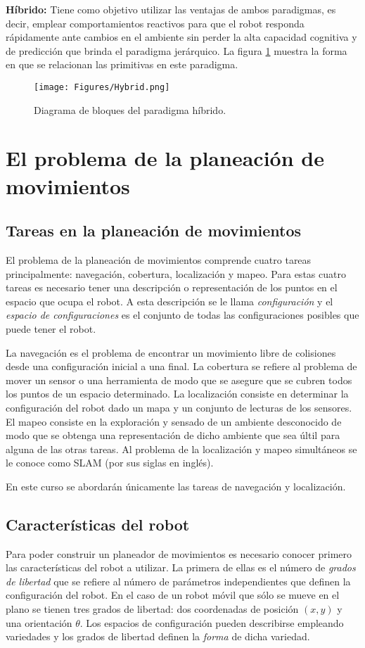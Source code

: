 \documentclass[a4paper]{article}
\begin{document}
\textbf{Híbrido:} Tiene como objetivo utilizar las ventajas de ambos paradigmas, es decir, emplear comportamientos reactivos para que el robot responda rápidamente ante cambios en el ambiente sin perder la alta capacidad cognitiva y de predicción que brinda el paradigma jerárquico. La figura \ref{fig:ParadigmHybrid} muestra la forma en que se relacionan las primitivas en este paradigma. 
\begin{figure}
  \centering
  \texttt{[image: Figures/Hybrid.png]}
  \caption{Diagrama de bloques del paradigma híbrido.}
  \label{fig:ParadigmHybrid}
\end{figure}


\section{El problema de la planeación de movimientos}
\subsection{Tareas en la planeación de movimientos}
\label{sec:Tasks}

El problema de la planeación de movimientos comprende cuatro tareas principalmente: navegación, cobertura, localización y mapeo. 
Para estas cuatro tareas es necesario tener una descripción o representación de los puntos en el espacio que ocupa el robot. A esta descripción se le llama \textit{configuración} y el \textit{espacio de configuraciones} es el conjunto de todas las configuraciones posibles que puede tener el robot.

La navegación es el problema de encontrar un movimiento libre de colisiones desde una configuración inicial a una final. La cobertura se refiere al problema de mover un sensor o una herramienta de modo que se asegure que se cubren todos los puntos de un espacio determinado. La localización consiste en determinar la configuración del robot dado un mapa y un conjunto de lecturas de los sensores. El mapeo consiste en la exploración y sensado de un ambiente desconocido de modo que se obtenga una representación de dicho ambiente que sea últil para alguna de las otras tareas. Al problema de la localización y mapeo simultáneos se le conoce como SLAM (por sus siglas en inglés). 

En este curso se abordarán únicamente las tareas de navegación y localización. 

\subsection{Características del robot}
Para poder construir un planeador de movimientos es necesario conocer primero las características del robot a utilizar. La primera de ellas es el número de \textit{grados de libertad} que se refiere al número de parámetros independientes que definen la configuración del robot. En el caso de un robot móvil que sólo se mueve en el plano se tienen tres grados de libertad: dos coordenadas de posición $(x,y)$ y una orientación $\theta$. Los espacios de configuración pueden describirse empleando variedades y los grados de libertad definen la \textit{forma} de dicha variedad.
\end{document}
